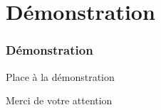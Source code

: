 \section{Démonstration}
    
    \begin{frame}
        \frametitle{Démonstration}
        
        \begin{center}
            \huge{Place à la démonstration}
        \end{center}
        
    \end{frame}
    
	\begin{frame}{\space}
        
        \begin{center}
            \huge{Merci de votre attention}
        \end{center}
        
    \end{frame}
